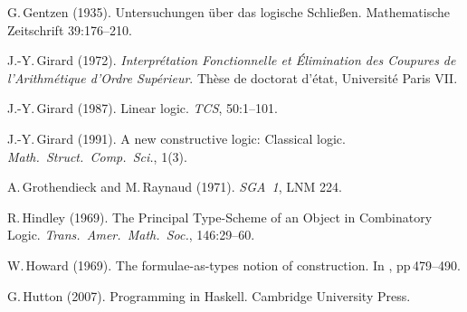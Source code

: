 \documentclass[11pt,twocolumn]{article}
\newcommand{\hide}[1]{}
\begin{document}
{\begin{thebibliography}{000}
G.\,Gentzen (1935). 
\newblock Untersuchungen \"uber das logische Schlie{\ss}en. 
\newblock Mathematische Zeitschrift 39:176--210.


J.-Y.\,Girard (1972).
\newblock \emph{Interpr\'{e}tation Fonctionnelle et \'{E}li\-mi\-na\-tion des
  Coupures de l'Arithm\'{e}tique d'Ordre Sup\'{e}rieur}.
\newblock Th\`{e}se de doctorat d'\'{e}tat, Universit\'{e} Paris VII. 

J.-Y.\,Girard (1987). 
\newblock Linear logic.
\newblock \emph{TCS}, 50:1--101.

J.-Y.\,Girard (1991). 
\newblock A new constructive logic: Classical logic.
\newblock \emph{Math.\ Struct.\ Comp.\ Sci.}, 1(3).

\hide{
\bibitem{Griffin}
T.\,Griffin.
\newblock A Formulae-as-Types notion of control.
\newblock In \emph{POPL'90}, pp.\,47--58.
}

A.\,Grothendieck and M.\,Raynaud (1971).
\newblock \emph{SGA~1}, LNM 224.


R.\,Hindley (1969).
\newblock The Principal Type-Scheme of an Object in Combinatory Logic.
\newblock \emph{Trans.\ Amer.\ Math.\ Soc.}, 146:29--60.



W.\,Howard (1969).
\newblock The formulae-as-types notion of construction.
\newblock In \emph{\cite{ToHBCurry}}, pp\,479--490. 

G.\,Hutton (2007).
\newblock Programming in Haskell.
\newblock Cambridge University Press.


\end{thebibliography}}
\end{document}
